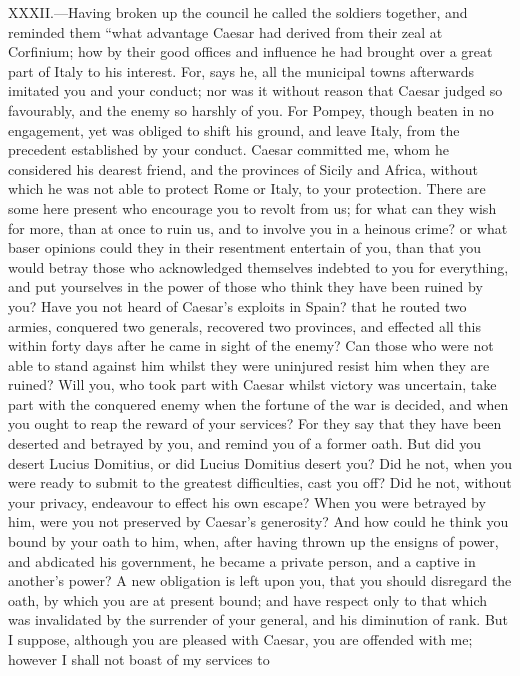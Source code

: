 XXXII.—Having broken up the council he called the soldiers together,
and reminded them ``what advantage Caesar had derived from their zeal at
Corfinium; how by their good offices and influence he had brought over a
great part of Italy to his interest. For, says he, all the municipal
towns afterwards imitated you and your conduct; nor was it without
reason that Caesar judged so favourably, and the enemy so harshly of
you. For Pompey, though beaten in no engagement, yet was obliged to
shift his ground, and leave Italy, from the precedent established by
your conduct. Caesar committed me, whom he considered his dearest
friend, and the provinces of Sicily and Africa, without which he was not
able to protect Rome or Italy, to your protection. There are some here
present who encourage you to revolt from us; for what can they wish for
more, than at once to ruin us, and to involve you in a heinous crime? or
what baser opinions could they in their resentment entertain of you,
than that you would betray those who acknowledged themselves indebted to
you for everything, and put yourselves in the power of those who think
they have been ruined by you? Have you not heard of Caesar's exploits in
Spain? that he routed two armies, conquered two generals, recovered two
provinces, and effected all this within forty days after he came in
sight of the enemy? Can those who were not able to stand against him
whilst they were uninjured resist him when they are ruined? Will you,
who took part with Caesar whilst victory was uncertain, take part with
the conquered enemy when the fortune of the war is decided, and when you
ought to reap the reward of your services? For they say that they have
been deserted and betrayed by you, and remind you of a former oath. But
did you desert Lucius Domitius, or did Lucius Domitius desert you? Did
he not, when you were ready to submit to the greatest difficulties, cast
you off? Did he not, without your privacy, endeavour to effect his own
escape? When you were betrayed by him, were you not preserved by
Caesar's generosity? And how could he think you bound by your oath to
him, when, after having thrown up the ensigns of power, and abdicated
his government, he became a private person, and a captive in another's
power? A new obligation is left upon you, that you should disregard the
oath, by which you are at present bound; and have respect only to that
which was invalidated by the surrender of your general, and his
diminution of rank. But I suppose, although you are pleased with Caesar,
you are offended with me; however I shall not boast of my services to
